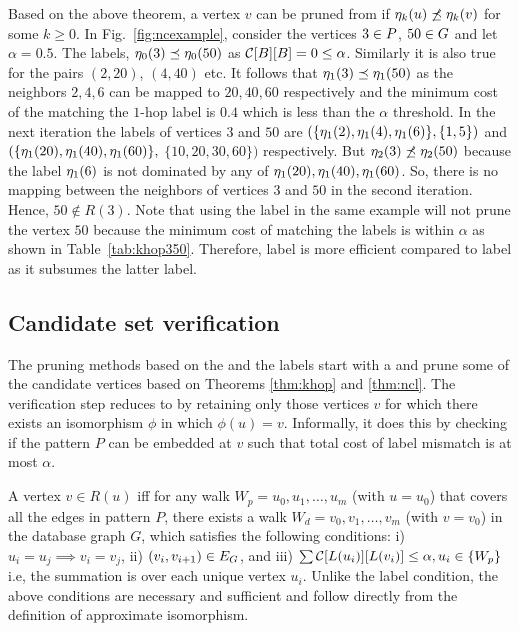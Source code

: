Based on the above theorem, a vertex $v$ can be pruned from \CR if
$\eta_{k}(u) \not\preceq \eta_{k}(v)$ for some $k \geq 0$. In
Fig.~\ref{fig:ncexample}, consider the vertices $3 \in P$, 
$50 \in
G$ and let $\alpha = 0.5$. The \ncl labels, $\eta_{0}(3) \preceq
\eta_{0}(50)$ as ${\mathcal{C}}[B][B] = 0 \leq \alpha$.  Similarly it is
also true for the pairs $(2, 20)$, $(4, 40)$ etc. It follows that
$\eta_{1}(3) \preceq \eta_{1}(50)$ as the neighbors $2, 4, 6$ can be
mapped to $20, 40, 60$ respectively and  the minimum cost of the
matching the $1$-hop label is $0.4$ which is less than the $\alpha$
threshold. In the next iteration the \ncl labels of vertices $3$ and
$50$ are $( \{ \eta_{1}(2), \eta_{1}(4), \eta_{1}(6) \}, \{1, 5 \} )$
and \\ $( \{ \eta_{1}(20), \eta_{1}(40), \eta_{1}(60) \},$ $\{10, 20, 30, 60 \} )$
respectively.
But $\eta_{2}(3) \not\preceq \eta_{2}(50)$ because the \ncl
label $\eta_{1}(6)$ is not dominated by any of
$\eta_{1}(20), \eta_{1}(40), \eta_{1}(60)$.
So, there is no mapping between the
neighbors of vertices $3$ and $50$ in the second iteration. Hence, $50
\notin R(3)$.  Note that using the \khop label in the same example will
not prune the vertex $50$ because the minimum cost of matching the \khop
labels is within $\alpha$ as shown in Table~\ref{tab:khop350}.
Therefore, \ncl label is more efficient compared to \khop label as it
subsumes the latter label.


\subsection{Candidate set verification} \label{sec:verification} The
pruning methods based on the \khop and the \ncl labels start with a \CR
and prune some of the candidate vertices based on
Theorems \ref{thm:khop} and \ref{thm:ncl}.  The
verification step reduces \CR to \RS by retaining only those vertices
$v$ for which there exists an isomorphism $\phi$ in which $\phi(u) = v$.
Informally, it does this by checking if the pattern $P$ can be embedded
at $v$ such that total cost of label mismatch is at most $\alpha$.

A vertex $v \in R(u)$ iff for any walk $W_p = u_0,u_1,\ldots,u_m$ (with
$u=u_0$)
that covers all the edges in pattern $P$, there exists a walk
$W_d = v_0, v_1,\ldots, v_m$ (with $v=v_0$) in the database graph $G$,
which satisfies the
following conditions: i) $u_i = u_j \implies v_i = v_j$, 
ii) $(v_i, v_{i+1}) \in E_G$,
and iii) $\sum{\mathcal{C}}[L(u_i)][L(v_i)] \leq \alpha, u_i \in \{W_p\}$ i.e,
the summation is over each unique vertex $u_i$.
Unlike the \ncl label condition, the above conditions are necessary and
sufficient and follow directly from the definition of
approximate isomorphism.

